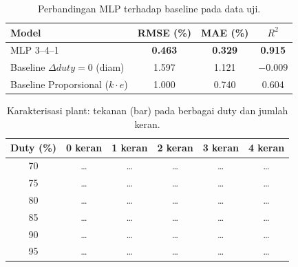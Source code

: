 \begin{table}[h]
  \centering
  \caption{Perbandingan MLP terhadap baseline pada data uji.}
  \label{tab:baseline}
  \begin{tabular}{lccc}
    \hline
    \textbf{Model} & \textbf{RMSE (\%)} & \textbf{MAE (\%)} & \textbf{$R^2$} \\
    \hline
    MLP 3--4--1                         & \textbf{0.463} & \textbf{0.329} & \textbf{0.915} \\
    Baseline $\Delta duty=0$ (diam)     & 1.597 & 1.121 & $-0.009$ \\
    Baseline Proporsional ($k\cdot e$)  & 1.000 & 0.740 & 0.604 \\
    \hline
  \end{tabular}
\end{table}

\begin{table}[h]
  \centering
  \caption{Karakterisasi plant: tekanan (bar) pada berbagai duty dan jumlah keran.}
  \label{tab:karakterisasi}
  \begin{tabular}{cccccc}
    \hline
    \textbf{Duty (\%)} & \textbf{0 keran} & \textbf{1 keran} & \textbf{2 keran} & \textbf{3 keran} & \textbf{4 keran} \\
    \hline
    70 & \dots & \dots & \dots & \dots & \dots \\
    75 & \dots & \dots & \dots & \dots & \dots \\
    80 & \dots & \dots & \dots & \dots & \dots \\
    85 & \dots & \dots & \dots & \dots & \dots \\
    90 & \dots & \dots & \dots & \dots & \dots \\
    95 & \dots & \dots & \dots & \dots & \dots \\
    \hline
  \end{tabular}
\end{table}

